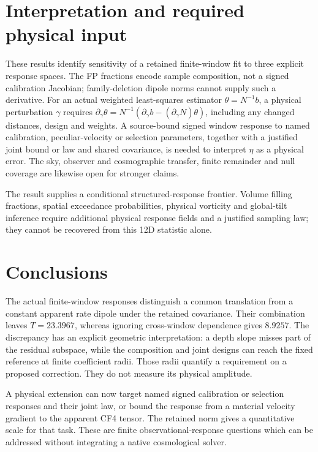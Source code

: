 \documentclass[aps,prd,reprint,onecolumn,superscriptaddress,nofootinbib]{revtex4-2}
\begin{document}


\section{Interpretation and required physical input}

These results identify sensitivity of a retained finite-window fit to three explicit response spaces. The FP fractions encode sample composition, not a signed calibration Jacobian; family-deletion dipole norms cannot supply such a derivative. For an actual weighted least-squares estimator $\theta=N^{-1}b$, a physical perturbation $\gamma$ requires $\partial_\gamma\theta=N^{-1}(\partial_\gamma b-(\partial_\gamma N)\theta)$, including any changed distances, design and weights. A source-bound signed window response to named calibration, peculiar-velocity or selection parameters, together with a justified joint bound or law and shared covariance, is needed to interpret $\eta$ as a physical error. The sky, observer and cosmographic transfer, finite remainder and null coverage are likewise open for stronger claims.

The result supplies a conditional structured-response frontier. Volume filling fractions, spatial exceedance probabilities, physical vorticity and global-tilt inference require additional physical response fields and a justified sampling law; they cannot be recovered from this 12D statistic alone.

\section{Conclusions}
The actual finite-window responses distinguish a common translation from a constant apparent rate dipole under the retained covariance. Their combination leaves $T=23.3967$, whereas ignoring cross-window dependence gives $8.9257$. The discrepancy has an explicit geometric interpretation: a depth slope misses part of the residual subspace, while the composition and joint designs can reach the fixed reference at finite coefficient radii. Those radii quantify a requirement on a proposed correction. They do not measure its physical amplitude.

A physical extension can now target named signed calibration or selection responses and their joint law, or bound the response from a material velocity gradient to the apparent CF4 tensor. The retained norm gives a quantitative scale for that task. These are finite observational-response questions which can be addressed without integrating a native cosmological solver.
\end{document}
